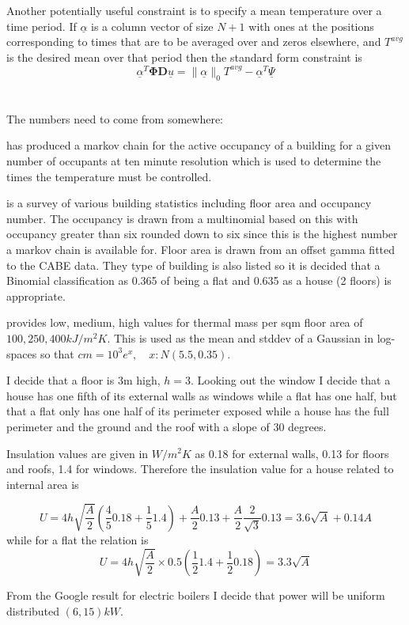 \documentclass[11pt]{article}
\begin{document}
Another potentially useful constraint is to specify a mean temperature over a time period. If $\underline{\alpha}$ is a column vector of size $N+1$ with ones at the positions corresponding to times that are to be averaged over and zeros elsewhere, and $T^{avg}$ is the desired mean over that period then the standard form constraint is
\begin{equation}
\underline{\alpha}^{T} \mathbf{\Phi} \mathbf{D} \underline{u} = \|\underline{\alpha}\|_{0} T^{avg} -\underline{\alpha}^{T} \underline{\Psi}
\end{equation}

\section{}
The numbers need to come from somewhere:

\cite{richardson2008high} has produced a markov chain for the active occupancy of a building for a given number of occupants at ten minute resolution which is used to determine the times the temperature must be controlled.

\cite{CABE} is a survey of various building statistics including floor area and occupancy number. The occupancy is drawn from a multinomial based on this  with occupancy greater than six rounded down to six since this is the highest number a markov chain is available for. Floor area is drawn from an offset gamma fitted to the CABE data. They type of building is also listed so it is decided that a Binomial classification as 0.365 of being a flat and 0.635 as a house (2 floors) is appropriate.

\cite{SAP} provides low, medium, high values for thermal mass per sqm floor area of $100,250,400 kJ/m^{2}K$. This is used as the mean and stddev of a Gaussian in log-spaces so that $cm=10^{3}e^{x},\quad x:N(5.5,0.35)$.

I decide that a floor is 3m high, $h=3$. Looking out the window I decide that a house has one fifth of its external walls as windows  while a flat has one half, but that a flat only has one half of its perimeter exposed while a house has the full perimeter and the ground and the roof with a slope of 30 degrees.

Insulation values are given in $W/m^{2}K$ as 0.18 for external walls, 0.13 for floors and roofs, 1.4 for windows. Therefore the insulation value for a house related to internal area is

\begin{equation}
U=4h \sqrt{\frac{A}{2}}(\frac{4}{5}0.18 + \frac{1}{5}1.4) + \frac{A}{2}0.13+\frac{A}{2}\frac{2}{\sqrt{3}}0.13 = 3.6\sqrt{A}+0.14A
\end{equation}
while for a flat the relation is
\begin{equation}
U=4h \sqrt{\frac{A}{2}}\times 0.5(\frac{1}{2}1.4+\frac{1}{2}0.18)=3.3\sqrt{A}
\end{equation}

From the Google result for electric boilers I decide that power will be uniform distributed $(6,15)kW$.
{}

\end{document}
